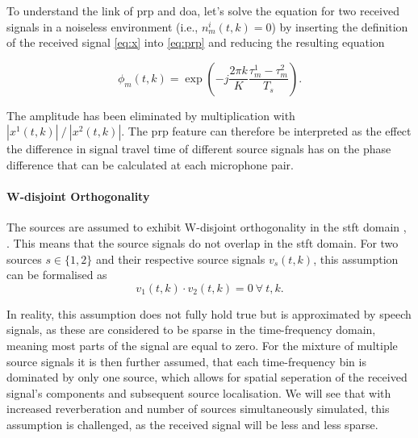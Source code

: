 To understand the link of \gls{prp} and \gls{doa}, let's solve the equation for two received signals in a noiseless environment (i.e., $n^i_{m}(t,k)=0$) by inserting the definition of the received signal \eqref{eq:x} into \eqref{eq:prp} and reducing the resulting equation

\begin{equation}
    \phi_{m}(t,k)=\exp{\left ( -j\frac{2\pi k}{K}\frac{\tau_{m}^1-\tau_{m}^2}{T_s}\right )}.
\end{equation}

The amplitude has been eliminated by multiplication with $|x^1(t,k)|\ /\ |x^2(t,k)|$. The \gls{prp} feature can therefore be interpreted as the effect the difference in signal travel time of different source signals has on the phase difference that can be calculated at each microphone pair.

\paragraph{W-disjoint Orthogonality}
The sources are assumed to exhibit W-disjoint orthogonality in the \gls{stft} domain \cite[p.~393]{Schwartz2014}, \cite{Rickard2006}. This means that the source signals do not overlap in the \gls{stft} domain. For two sources $s\in\{1,2\}$ and their respective source signals $v_s(t,k)$, this assumption can be formalised as
\begin{equation}
    v_1(t,k)\cdot v_2(t,k)=0~\forall~t,k.
\end{equation}

In reality, this assumption does not fully hold true but is approximated by speech signals, as these are considered to be sparse in the time-frequency domain, meaning most parts of the signal are equal to zero. For the mixture of multiple source signals it is then further assumed, that each time-frequency bin is dominated by only one source, which allows for spatial seperation of the received signal's components and subsequent source localisation. We will see that with increased reverberation and number of sources simultaneously simulated, this assumption is challenged, as the received signal will be less and less sparse.